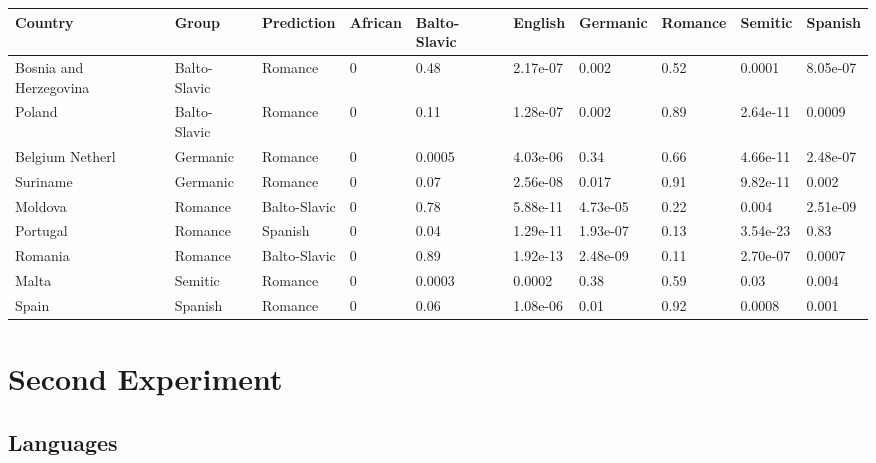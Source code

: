 \documentclass[a4paper,10pt]{article}
\begin{document}
\begin{landscape}
\begin{tabularx}{\textwidth}{llllllllll}
\toprule
    Country & Group & Prediction & African & Balto-Slavic & English & Germanic & Romance & Semitic & Spanish \\
\midrule
\endhead
Bosnia and Herzegovina & Balto-Slavic & Romance & 0 & 0.48 & 2.17e-07 & 0.002 & 0.52 & 0.0001 & 8.05e-07 \\
Poland & Balto-Slavic & Romance & 0 & 0.11 & 1.28e-07 & 0.002 & 0.89 & 2.64e-11 & 0.0009 \\
Belgium Netherl & Germanic & Romance & 0 & 0.0005 & 4.03e-06 & 0.34 & 0.66 & 4.66e-11 & 2.48e-07 \\
Suriname & Germanic & Romance & 0 & 0.07 & 2.56e-08 & 0.017 & 0.91 & 9.82e-11 & 0.002 \\
Moldova & Romance & Balto-Slavic & 0 & 0.78 & 5.88e-11 & 4.73e-05 & 0.22 & 0.004 & 2.51e-09 \\
Portugal & Romance & Spanish & 0 & 0.04 & 1.29e-11 & 1.93e-07 & 0.13 & 3.54e-23 & 0.83 \\
Romania & Romance & Balto-Slavic & 0 & 0.89 & 1.92e-13 & 2.48e-09 & 0.11 & 2.70e-07 & 0.0007 \\
Malta & Semitic & Romance & 0 & 0.0003 & 0.0002 & 0.38 & 0.59 & 0.03 & 0.004 \\
Spain & Spanish & Romance & 0 & 0.06 & 1.08e-06 & 0.01 & 0.92 & 0.0008 & 0.001 \\
\bottomrule
\end{tabularx}
\end{landscape}

\section{Second Experiment}

\subsection{Languages}
\end{document}
